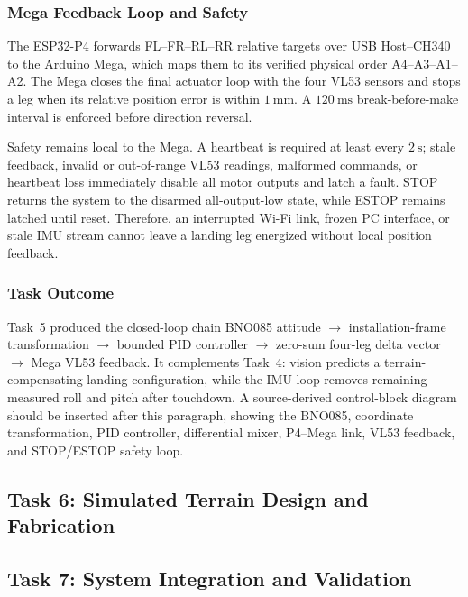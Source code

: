 \documentclass{engr1000j-s2}
\begin{document}
\subsubsection{Mega Feedback Loop and Safety}

The ESP32-P4 forwards FL--FR--RL--RR relative targets over USB Host--CH340 to the Arduino Mega, which maps them to its verified physical order A4--A3--A1--A2. The Mega closes the final actuator loop with the four VL53 sensors and stops a leg when its relative position error is within $1~\mathrm{mm}$. A $120~\mathrm{ms}$ break-before-make interval is enforced before direction reversal.

Safety remains local to the Mega. A heartbeat is required at least every $2~\mathrm{s}$; stale feedback, invalid or out-of-range VL53 readings, malformed commands, or heartbeat loss immediately disable all motor outputs and latch a fault. STOP returns the system to the disarmed all-output-low state, while ESTOP remains latched until reset. Therefore, an interrupted Wi-Fi link, frozen PC interface, or stale IMU stream cannot leave a landing leg energized without local position feedback.

\subsubsection{Task Outcome}

Task~5 produced the closed-loop chain BNO085 attitude $\rightarrow$ installation-frame transformation $\rightarrow$ bounded PID controller $\rightarrow$ zero-sum four-leg delta vector $\rightarrow$ Mega VL53 feedback. It complements Task~4: vision predicts a terrain-compensating landing configuration, while the IMU loop removes remaining measured roll and pitch after touchdown. A source-derived control-block diagram should be inserted after this paragraph, showing the BNO085, coordinate transformation, PID controller, differential mixer, P4--Mega link, VL53 feedback, and STOP/ESTOP safety loop.

\newpage

\subsection{Task 6: Simulated Terrain Design and Fabrication}



\newpage

\subsection{Task 7: System Integration and Validation}
\end{document}
